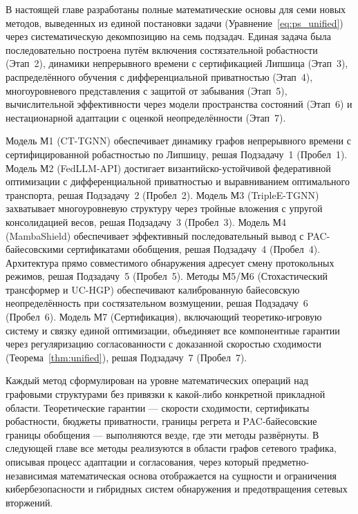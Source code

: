 В настоящей главе разработаны полные математические основы для семи новых методов, выведенных из единой постановки задачи (Уравнение~\eqref{eq:ps_unified}) через систематическую декомпозицию на семь подзадач. Единая задача была последовательно построена путём включения состязательной робастности (Этап~2), динамики непрерывного времени с сертификацией Липшица (Этап~3), распределённого обучения с дифференциальной приватностью (Этап~4), многоуровневого представления с защитой от забывания (Этап~5), вычислительной эффективности через модели пространства состояний (Этап~6) и нестационарной адаптации с оценкой неопределённости (Этап~7).

Модель М1 (CT-TGNN) обеспечивает динамику графов непрерывного времени с сертифицированной робастностью по Липшицу, решая Подзадачу~1 (Пробел~1). Модель М2 (FedLLM-API) достигает византийско-устойчивой федеративной оптимизации с дифференциальной приватностью и выравниванием оптимального транспорта, решая Подзадачу~2 (Пробел~2). Модель М3 (TripleE-TGNN) захватывает многоуровневую структуру через тройные вложения с упругой консолидацией весов, решая Подзадачу~3 (Пробел~3). Модель М4 (MambaShield) обеспечивает эффективный последовательный вывод с PAC-байесовскими сертификатами обобщения, решая Подзадачу~4 (Пробел~4). Архитектура прямо совместимого обнаружения адресует смену протокольных режимов, решая Подзадачу~5 (Пробел~5). Методы М5/М6 (Стохастический трансформер и UC-HGP) обеспечивают калиброванную байесовскую неопределённость при состязательном возмущении, решая Подзадачу~6 (Пробел~6). Модель М7 (Сертификация), включающий теоретико-игровую систему и связку единой оптимизации, объединяет все компонентные гарантии через регуляризацию согласованности с доказанной скоростью сходимости (Теорема~\ref{thm:unified}), решая Подзадачу~7 (Пробел~7).

Каждый метод сформулирован на уровне математических операций над графовыми структурами без привязки к какой-либо конкретной прикладной области. Теоретические гарантии --- скорости сходимости, сертификаты робастности, бюджеты приватности, границы регрета и PAC-байесовские границы обобщения --- выполняются везде, где эти методы развёрнуты. В следующей главе все методы реализуются в области графов сетевого трафика, описывая процесс адаптации и согласования, через который предметно-независимая математическая основа отображается на сущности и ограничения кибербезопасности и гибридных систем обнаружения и предотвращения сетевых вторжений.


